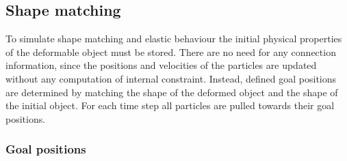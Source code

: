 \subsection{Shape matching}

To simulate shape matching and elastic behaviour the initial physical properties of the deformable
object must be stored. There are no need for any connection information, since the positions and velocities of the particles 
are updated without any computation of internal constraint. Instead, defined goal positions are determined by matching the shape of the deformed 
object and the shape of the initial object. For each time step all particles are pulled towards their goal positions.

\subsubsection{Goal positions}